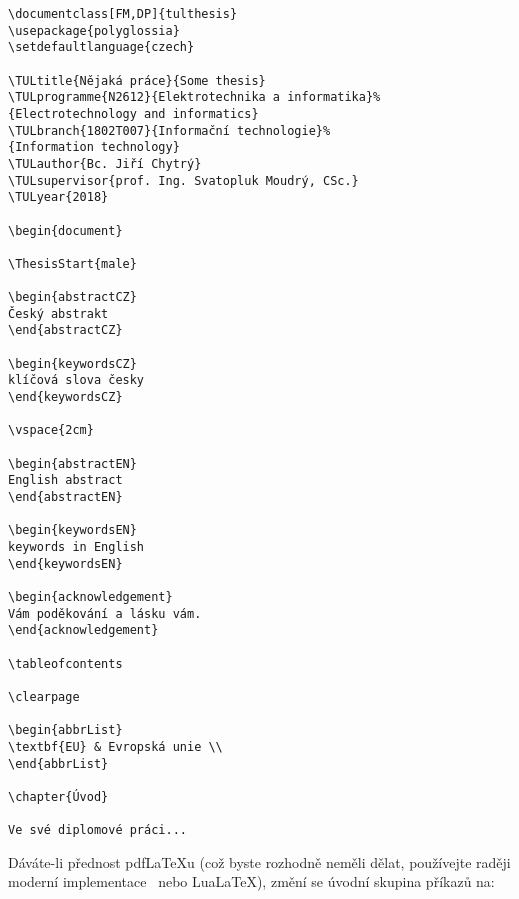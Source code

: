 \documentclass[fonts,numbering,twoside,margins]{./tulpackage/tulthesis}
\newenvironment{myquote}{\begin{list}{}{\setlength\leftmargin\parindent}\item[]}{\end{list}}
\newenvironment{listing}{\begin{myquote}\color{\tulcolor}}{\end{myquote}}
\begin{document}
\begin{listing}
\begin{verbatim}
\documentclass[FM,DP]{tulthesis}
\usepackage{polyglossia}
\setdefaultlanguage{czech}

\TULtitle{Nějaká práce}{Some thesis}
\TULprogramme{N2612}{Elektrotechnika a informatika}%
{Electrotechnology and informatics}
\TULbranch{1802T007}{Informační technologie}%
{Information technology}
\TULauthor{Bc. Jiří Chytrý}
\TULsupervisor{prof. Ing. Svatopluk Moudrý, CSc.}
\TULyear{2018}

\begin{document}

\ThesisStart{male}

\begin{abstractCZ}
Český abstrakt
\end{abstractCZ}

\begin{keywordsCZ}
klíčová slova česky
\end{keywordsCZ}

\vspace{2cm}

\begin{abstractEN}
English abstract
\end{abstractEN}

\begin{keywordsEN}
keywords in English
\end{keywordsEN}

\begin{acknowledgement}
Vám poděkování a lásku vám.
\end{acknowledgement}

\tableofcontents

\clearpage

\begin{abbrList}
\textbf{EU} & Evropská unie \\
\end{abbrList}

\chapter{Úvod}

Ve své diplomové práci...
\end{verbatim}
\end{listing}

Dáváte-li přednost pdf\LaTeX u (což byste rozhodně neměli dělat, používejte raději
moderní implementace \XeLaTeX\ nebo Lua\LaTeX), změní se úvodní skupina příkazů na:
\end{document}
